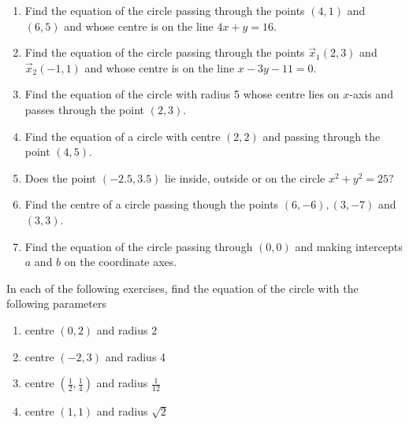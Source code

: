 \begin{enumerate}[label=\thesubsection.\arabic*, ref=\thesubsection.\theenumi]
  \item Find the equation of the circle passing through the points $(4, 1)$ and $(6, 5)$ and whose centre is on the line $ 4x+y=16. $
\label{chapters/11/11/1/10}
\\
\solution

  \item Find the equation of the circle passing through the points $\vec{x}_1(2, 3)$ and $\vec{x}_2(-1, 1)$ and whose centre is on the line $x-3y-11=0$.
\label{chapters/11/11/1/11}
\\
\solution 

  \item Find the equation of the circle with radius 5 whose centre lies on $x$-axis and passes through the point $(2, 3)$.
\label{chapters/11/11/1/12}
\\
\solution 

  \item Find the equation of a circle with centre $(2, 2)$ and passing through the point $(4, 5)$.
\label{chapters/11/11/1/14}
\\
\solution

  \item Does the point $(-2.5, 3.5)$ lie inside,  outside or on the circle $x^{2}+y^{2}=25?$
\\
\solution

\item Find the centre of a circle passing though the points $(6, -6),  (3, -7)$ and $(3, 3)$. \\ 
\label{chapters/10/7/4/3}
\solution 

  \item Find the equation of the circle passing through $(0, 0)$ and making intercepts $a$ and $b$ on the coordinate axes.
\end{enumerate}
In each of the following exercises,  find the equation of the circle with the following parameters
\begin{enumerate}[label=\thesubsection.\arabic*, ref=\thesubsection.\theenumi, resume*]
 \item centre $(0, 2)$ and radius $2$
	 \\
		\solution
\label{chapters/11/11/1/1}

%
  \item centre $(-2, 3)$ and radius 4
	 \\
		\solution
\label{chapters/11/11/1/2}


  \item centre $\left(\frac{1}{2},  \frac{1}{4}\right)$ and radius $\frac{1}{12}$
\label{chapters/11/11/1/3}
	 \\
		\solution

  \item centre $(1, 1)$ and radius $\sqrt{2}$
	 \\
		\solution

\end{enumerate}
